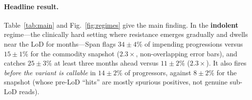 \documentclass[11pt]{article}
\newcommand{\1}{\mathbf{1}}
\begin{document}
\begin{table}[t]\centering
\small
\caption{\textbf{Span roughly doubles early detection of impending resistance at
a matched 10\% false-alarm rate}, with a dose-response in emergence speed. Mean
$\pm$ std over five seeds; all data synthetic. ``Early'' $=$ flagged $\ge$12 weeks
before imaging; ``pre-LoD'' $=$ flagged before the variant is callable. The
slope-CUSUM tracks the snapshot, isolating the gain to the censored
detection-process model.}
\label{tab:main}
\end{table}

\paragraph{Headline result.}
Table~\ref{tab:main} and Fig.~\ref{fig:regimes} give the main finding. In the
\textbf{indolent} regime---the clinically hard setting where resistance emerges
gradually and dwells near the LoD for months---Span flags $34\pm4\%$ of
impending progressions versus $15\pm1\%$ for the commodity snapshot
($2.3\times$, non-overlapping error bars), and catches $25\pm3\%$ at least three
months ahead versus $11\pm2\%$ ($2.3\times$). It also fires \emph{before the
variant is callable} in $14\pm2\%$ of progressors, against $8\pm2\%$ for the
snapshot (whose pre-LoD ``hits'' are mostly spurious positives, not genuine
sub-LoD reads).
\end{document}

